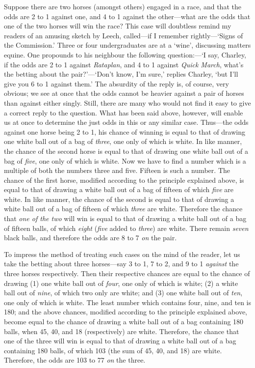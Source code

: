 \documentclass[letterpaper,12pt,oneside,openany]{memoir}
\begin{document}
Suppose there are two horses (amongst others)
engaged in a race, and that the odds are 2 to 1 against
one, and 4 to 1 against the other---what are the odds
that one of the two horses will win the race? This
case will doubtless remind my readers of an amusing
sketch by Leech, called---if I remember rightly---`Signs
of the Commission.' Three or four undergraduates are
at a `wine', discussing matters equine. One propounds
to his neighbour the following question:---`I say, Charley,
if the odds are 2 to 1 against \textit{Rataplan}, and 4 to 1
against \textit{Quick March}, what's the betting about the
pair?'---`Don't know, I'm sure,' replies Charley, `but
I'll give you 6 to 1 against them.' The absurdity of
the reply is, of course, very obvious; we see at once
that the odds cannot be heavier against a pair of
horses than against either singly. Still, there are
many who would not find it easy to give a correct reply
to the question. What has been said above, however,
will enable us at once to determine the just odds in
this or any similar case. Thus---the odds against one
horse being 2 to 1, his chance of winning is equal to
that of drawing one white ball out of a bag of \textit{three},
one only of which is white. In like manner, the
chance of the second horse is equal to that of drawing
one white ball out of a bag of \textit{five}, one only of which is
white. Now we have to find a number which is a
multiple of both the numbers three and five. Fifteen
is such a number. The chance of the first horse, modified
according to the principle explained above, is equal
to that of drawing a white ball out of a bag of fifteen
of which \textit{five} are white. In like manner, the chance of
the second is equal to that of drawing a white ball out
of a bag of fifteen of which \textit{three} are white. Therefore
the chance that \textit{one of the two} will win is equal to that
of drawing a white ball out of a bag of fifteen balls, of
which \textit{eight} (\textit{five} added to \textit{three}) are white. There
remain \textit{seven} black balls, and therefore the odds are
8 to 7 \textit{on} the pair.

To impress the method of treating such cases on the
mind of the reader, let us take the betting about three
horses---say 3 to 1, 7 to 2, and 9 to 1 \textit{against} the three
horses respectively. Then their respective chances
are equal to the chance of drawing (1) one white ball
out of \textit{four}, one only of which is white; (2) a white
ball out of \textit{nine}, of which two only are white; and (3)
one white ball out of \textit{ten}, one only of which is white.
The least number which contains four, nine, and ten is
180; and the above chances, modified according to the
principle explained above, become equal to the chance
of drawing a white ball out of a bag containing 180 balls,
when 45, 40, and 18 (respectively) are white. Therefore,
the chance that one of the three will win is equal
to that of drawing a white ball out of a bag containing
180 balls, of which 103 (the sum of 45, 40, and 18)
are white. Therefore, the odds are 103 to 77 \textit{on} the
three.
\end{document}
